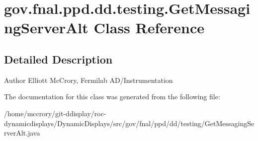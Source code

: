 \hypertarget{classgov_1_1fnal_1_1ppd_1_1dd_1_1testing_1_1GetMessagingServerAlt}{\section{gov.\-fnal.\-ppd.\-dd.\-testing.\-Get\-Messaging\-Server\-Alt Class Reference}
\label{classgov_1_1fnal_1_1ppd_1_1dd_1_1testing_1_1GetMessagingServerAlt}
}


\subsection{Detailed Description}
\begin{DoxyAuthor}{Author}
Elliott Mc\-Crory, Fermilab A\-D/\-Instrumentation 
\end{DoxyAuthor}


The documentation for this class was generated from the following file\-:\begin{DoxyCompactItemize}
\item 
/home/mccrory/git-\/ddisplay/roc-\/dynamicdisplays/\-Dynamic\-Displays/src/gov/fnal/ppd/dd/testing/Get\-Messaging\-Server\-Alt.\-java\end{DoxyCompactItemize}
